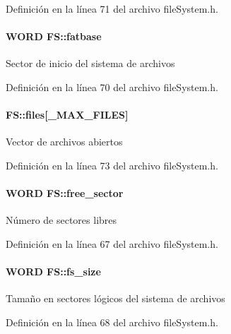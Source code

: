 Definición en la línea 71 del archivo file\+System.\+h.

\hypertarget{structFS_a7c6676234fc0734f2139c627a0b01428}{
\paragraph[{fatbase}]{\setlength{\rightskip}{0pt plus 5cm}W\+O\+R\+D F\+S\+::fatbase}}\label{structFS_a7c6676234fc0734f2139c627a0b01428}
Sector de inicio del sistema de archivos 

Definición en la línea 70 del archivo file\+System.\+h.

\hypertarget{structFS_a5772298ea6aafc77f842037933531a02}{
\paragraph[{files}]{ F\+S\+::files\mbox{[}\+\_\+\+M\+A\+X\+\_\+\+F\+I\+L\+E\+S\mbox{]}}}\label{structFS_a5772298ea6aafc77f842037933531a02}
Vector de archivos abiertos 

Definición en la línea 73 del archivo file\+System.\+h.

\hypertarget{structFS_adae8dcbe72b934a870bf663481207e3e}{
\paragraph[{free\+\_\+sector}]{\setlength{\rightskip}{0pt plus 5cm}W\+O\+R\+D F\+S\+::free\+\_\+sector}}\label{structFS_adae8dcbe72b934a870bf663481207e3e}
Número de sectores libres 

Definición en la línea 67 del archivo file\+System.\+h.

\hypertarget{structFS_ab8f2ed716ba1865bff2fe82d36e90546}{
\paragraph[{fs\+\_\+size}]{\setlength{\rightskip}{0pt plus 5cm}W\+O\+R\+D F\+S\+::fs\+\_\+size}}\label{structFS_ab8f2ed716ba1865bff2fe82d36e90546}
Tamaño en sectores lógicos del sistema de archivos 

Definición en la línea 68 del archivo file\+System.\+h.

